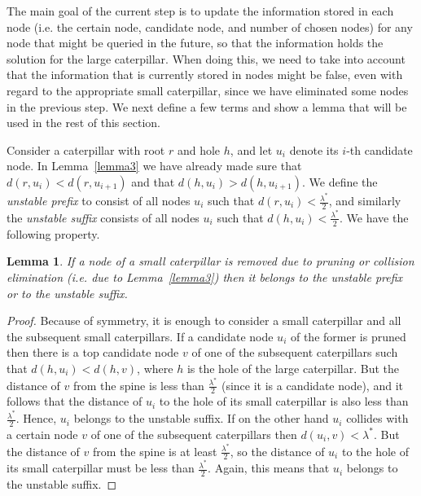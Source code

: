 \documentclass[11pt,a4paper]{article}
\newtheorem{lemma}{Lemma}
\theoremstyle{definition}
\theoremstyle{remark}
\begin{document}
The main goal of the current step is to update the information stored in each node (i.e. the certain node, candidate node, and number of chosen nodes) for any node that might be queried in the future, so that the information holds the solution for the large caterpillar. When doing this, we need to take into account that the information that is currently stored in nodes might be false, even with regard to the appropriate small caterpillar, since we have eliminated some nodes in the previous step.
We next define a few terms and show a lemma that will be used in the rest of this section.

\vspace{0.04in}  
Consider a caterpillar with root $r$ and hole $h$, and let $u_{i}$ denote its $i$-th candidate node. In Lemma~\ref{lemma3} we have already made sure that $d(r,u_{i}) < d(r,u_{i+1})$
and that $d(h,u_{i}) > d(h,u_{i+1})$. We define the \emph{unstable prefix} to
consist of all nodes $u_{i}$ such that $d(r,u_{i}) < \frac{\lambda^{*}}{2}$, and similarly the
\emph{unstable suffix} consists of all nodes $u_{i}$ such that $d(h,u_{i}) < \frac{\lambda^{*}}{2}$.
We have the following property.

\begin{lemma}
\label{stable infix}
If a node of a small caterpillar is removed due to pruning or collision elimination (i.e. due to Lemma~\ref{lemma3}) then it
belongs to the unstable prefix or to the unstable suffix.
\end{lemma}

\begin{proof}
Because of symmetry, it is enough to consider a small caterpillar and all the subsequent
small caterpillars. If a candidate node $u_{i}$ of the former is pruned then there is a top candidate node
$v$ of one of the subsequent caterpillars such that $d(h,u_{i}) < d(h,v)$, where $h$ is the hole
of the large caterpillar. But the distance of $v$ from the spine is less than $\frac{\lambda^{*}}{2}$ (since it is a candidate node),
 and it follows that the distance of $u_{i}$ to the hole of its small caterpillar is also less
than $\frac{\lambda^{*}}{2}$. Hence, $u_{i}$ belongs to the unstable suffix.
If on the other hand $u_{i}$ collides with a certain node $v$ of one of the subsequent
caterpillars then $d(u_{i},v)<\lambda^{*}$. But the distance of $v$ from the spine is at least
$\frac{\lambda^{*}}{2}$, so the distance of $u_{i}$ to the hole of its small caterpillar must be
less than $\frac{\lambda^{*}}{2}$. Again, this means that $u_{i}$ belongs to the unstable suffix.
\end{proof}
\end{document}
